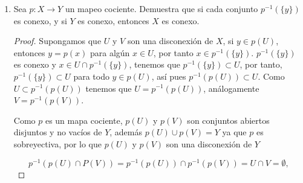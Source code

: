 \documentclass[12bpt]{article}
\begin{document}
\begin{enumerate}
\begin{enumerate}
\begin{proof}
        \end{proof}
        
        \item Demuestra que la unión $Y$ de los espacios $X_K$ es conexa.
        
        \begin{proof}
            En efecto $a\in X_K$, $K\subset J$, $|K|\leq \infty$, entonces 

            $$\bigcup_{K} X_K 
                $$
                es conexo porque es unión de conexos que comparten un punto.
        \end{proof}

        \item Demuestra que $X$ es igual a la clausura de $Y$; concluye que $X$ es conexo.

    \begin{proof}
    Sea $\mathbf{x}\in X$ y $\displaystyle{U=\prod_{\alpha\in J}U_{\alpha}}$ una vecindad de $\mathbf{x}$, tenemos entonces que $U_{\alpha} = X_{\alpha}$ para todos salvo finitos índices $\alpha$; de esta manera, existe un elemento $\mathbf{y}\in U$ tal que $y_{\alpha}=a_{\alpha}$ para todos salvo finitos índices $\alpha$. Por lo tanto $U \cap Y \neq \emptyset$. De esta manera $X=\overline{Y}$; y ya que la clausura de un subespacio conexo de $X$ es conexa, tenemos que $X$ es conexo.
    \end{proof}
    \end{enumerate}
    
    \item Sea $p : X \to Y$ un mapeo cociente. Demuestra que si cada conjunto $p^{-1}(\{y\})$ es conexo, y si $Y$ es conexo, entonces $X$ es conexo.
    
    \begin{proof}
    Supongamos que $U$ y $V$ son una disconexión de $X$, si $y \in p(U)$, entonces $y = p(x)$ para algún $x \in U$, por tanto $x \in p^{-1}(\{y\})$.  $p^{-1}(\{y\})$ es conexo y $x \in U \cap p^{-1}(\{y\})$, tenemos que $p^{-1}(\{y\}) \subset U$, por tanto, $p^{-1}(\{y\}) \subset U$ para todo $y \in p(U)$, así pues $p^{-1}(p(U)) \subset U$. Como $U \subset p^{-1}(p(U))$ tenemos que $U = p^{-1}(p(U))$, análogamente $V=p^{-1}(p(V))$.

  Como $p$ es un mapa cociente, $p(U)$ y $p(V)$ son conjuntos abiertos disjuntos y no vacíos de $Y$, además $p(U) \cup p(V) = Y$ ya que $p$ es sobreyectiva, por lo que $p(U)$ y $p(V)$ son una disconexión de $Y$

    $$p^{-1}(p(U)\cap P(V))=p^{-1}(p(U))\cap p^{-1}(p(V))=U\cap V=\emptyset,$$


\end{proof}
\end{enumerate}
\end{document}
